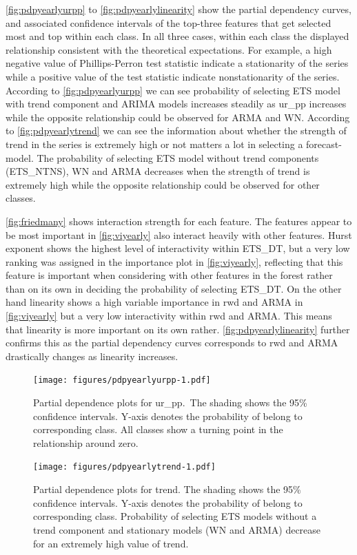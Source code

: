 \documentclass[11pt,a4paper,]{article}
\begin{document}
\autoref{fig:pdpyearlyurpp} to \autoref{fig:pdpyearlylinearity} show the partial dependency curves, and associated confidence intervals of the top-three features that get selected most and top within each class. In all three cases, within each class the displayed relationship consistent with the theoretical expectations. For example, a high negative value of Phillips-Perron test statistic indicate a stationarity of the series while a positive value of the test statistic indicate nonstationarity of the series. According to \autoref{fig:pdpyearlyurpp} we can see probability of selecting ETS model with trend component and ARIMA models increases steadily as ur\_pp increases while the opposite relationship could be observed for ARMA and WN. According to \autoref{fig:pdpyearlytrend} we can see the information about whether the strength of trend in the series is extremely high or not matters a lot in selecting a forecast-model. The probability of selecting ETS model without trend components (ETS\_NTNS), WN and ARMA decreases when the strength of trend is extremely high while the opposite relationship could be observed for other classes.

\autoref{fig:friedmany} shows interaction strength for each feature. The features appear to be most important in \autoref{fig:viyearly} also interact heavily with other features. Hurst exponent shows the highest level of interactivity within ETS\_DT, but a very low ranking was assigned in the importance plot in \autoref{fig:viyearly}, reflecting that this feature is important when considering with other features in the forest rather than on its own in deciding the probability of selecting ETS\_DT. On the other hand linearity shows a high variable importance in rwd and ARMA in \autoref{fig:viyearly} but a very low interactivity within rwd and ARMA. This means that linearity is more important on its own rather. \autoref{fig:pdpyearlylinearity} further confirms this as the partial dependency curves corresponds to rwd and ARMA drastically changes as linearity increases.

\begin{figure}
\centering
\texttt{[image: figures/pdpyearlyurpp-1.pdf]}
\caption{\label{fig:pdpyearlyurpp}Partial dependence plots for ur\_pp.~The shading shows the 95\% confidence intervals. Y-axis denotes the probability of belong to corresponding class. All classes show a turning point in the relationship around zero.}
\end{figure}

\begin{figure}
\centering
\texttt{[image: figures/pdpyearlytrend-1.pdf]}
\caption{\label{fig:pdpyearlytrend}Partial dependence plots for trend. The shading shows the 95\% confidence intervals. Y-axis denotes the probability of belong to corresponding class. Probability of selecting ETS models without a trend component and stationary models (WN and ARMA) decrease for an extremely high value of trend.}
\end{figure}
\end{document}
